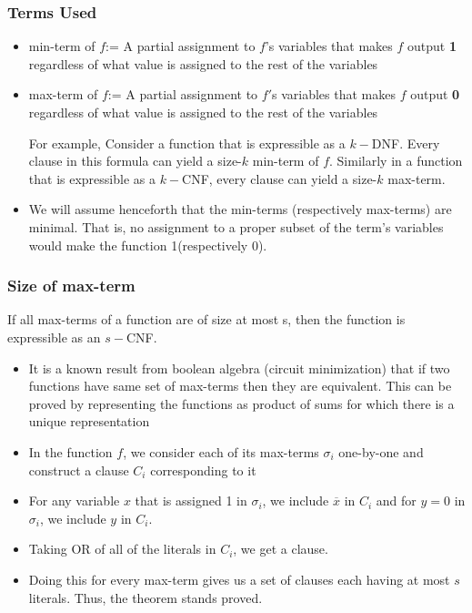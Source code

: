 \documentclass{beamer}[11pt]
\begin{document}
\begin{frame}
\frametitle{Terms Used}
\begin{itemize}
 \item min-term of $f$:= A partial assignment to $f$'s variables that makes $f$ output \textbf{1} regardless of what value is assigned to the rest of the variables
 \item max-term of $f$:= A partial assignment to $f'$s variables that makes $f$ output \textbf{0} regardless of what value is assigned to the rest of the variables
 
 For example, Consider a function that is expressible as a $k-$DNF. Every clause in this formula can yield a size-$k$ min-term of $f$. Similarly in a function that is expressible as a $k-$CNF, every clause can yield a size-$k$ max-term.
 \pause\item We will assume henceforth that the min-terms (respectively max-terms) are minimal. That is, no assignment to a proper subset of the term's variables would make the function 1(respectively 0).
 
 
\end{itemize}

\end{frame}


\begin{frame}
\frametitle{Size of max-term}
\begin{theorem}
\label{size}
 If all max-terms of a function are of size at most s, then the function is expressible as an $s-$CNF.

\end{theorem}
\begin{itemize}
 \item It is a known result from boolean algebra (circuit minimization) that if two functions have same set of max-terms then they are equivalent. This can be proved by representing the functions as product of sums for which there is a unique representation
 \item In the function $f$, we consider each of its max-terms $\sigma_i$ one-by-one and construct a clause $C_i$ corresponding to it
 \pause\item For any variable $x$ that is assigned 1 in $\sigma_i$, we include $\overline{x}$ in $C_i$ and for $y=0$ in $\sigma_i$, we include $y$ in $C_i$.
 \item Taking OR of all of the literals in $C_i$, we get a clause.
 \item Doing this for every max-term gives us a set of clauses each having at most $s$ literals. Thus, the theorem stands proved.
\end{itemize}

\end{frame}
\end{document}
